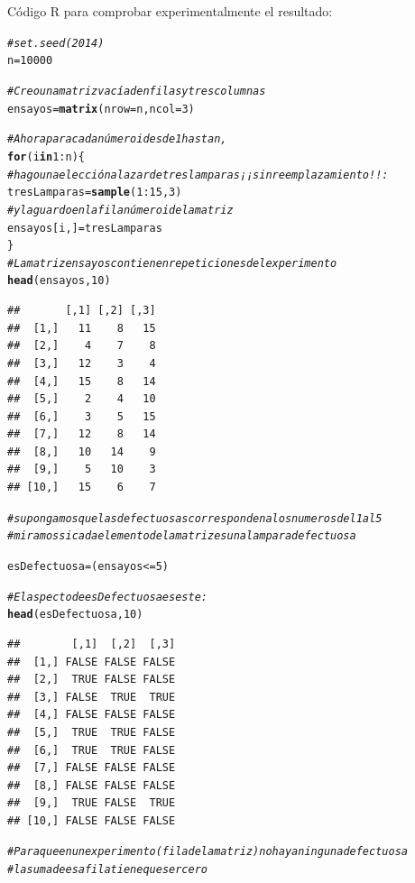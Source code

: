 \documentclass[10pt,a4paper]{article}\usepackage[]{graphicx}\usepackage[]{color}
\makeatletter
\newcommand{\hlnum}[1]{\textcolor[rgb]{0.686,0.059,0.569}{#1}}%
\newcommand{\hlcom}[1]{\textcolor[rgb]{0.678,0.584,0.686}{\textit{#1}}}%
\newcommand{\hlopt}[1]{\textcolor[rgb]{0,0,0}{#1}}%
\newcommand{\hlstd}[1]{\textcolor[rgb]{0.345,0.345,0.345}{#1}}%
\newcommand{\hlkwa}[1]{\textcolor[rgb]{0.161,0.373,0.58}{\textbf{#1}}}%
\newcommand{\hlkwb}[1]{\textcolor[rgb]{0.69,0.353,0.396}{#1}}%
\newcommand{\hlkwc}[1]{\textcolor[rgb]{0.333,0.667,0.333}{#1}}%
\newcommand{\hlkwd}[1]{\textcolor[rgb]{0.737,0.353,0.396}{\textbf{#1}}}%
\newenvironment{kframe}{%
 \def\at@end@of@kframe{}%
 \ifinner\ifhmode%
  \def\at@end@of@kframe{\end{minipage}}%
  \begin{minipage}{\columnwidth}%
 \fi\fi%
 \def\FrameCommand##1{\hskip\@totalleftmargin \hskip-\fboxsep
 \colorbox{shadecolor}{##1}\hskip-\fboxsep
     \hskip-\linewidth \hskip-\@totalleftmargin \hskip\columnwidth}%
 \MakeFramed {\advance\hsize-\width
   \@totalleftmargin\z@ \linewidth\hsize
   \@setminipage}}%
 {\par\unskip\endMakeFramed%
 \at@end@of@kframe}
\newenvironment{knitrout}{}{} %
\newcounter {cont01}
\makeatother
\begin{document}
Código R para comprobar experimentalmente el resultado:
\begin{knitrout}
\color{fgcolor}\begin{kframe}
\begin{alltt}
\hlcom{#set.seed(2014)}
\hlstd{n} \hlkwb{=} \hlnum{10000}

\hlcom{# Creo una matriz vacía de n filas y tres columnas}
\hlstd{ensayos} \hlkwb{=} \hlkwd{matrix}\hlstd{(}\hlkwc{nrow} \hlstd{= n,} \hlkwc{ncol} \hlstd{=} \hlnum{3}\hlstd{)}

\hlcom{# Ahora para cada número i desde 1 hasta n,}
\hlkwa{for}\hlstd{(i} \hlkwa{in} \hlnum{1}\hlopt{:}\hlstd{n)\{}
  \hlcom{# hago una elección al azar de tres lamparas ¡¡sin reemplazamiento!!:}
  \hlstd{tresLamparas} \hlkwb{=} \hlkwd{sample}\hlstd{(}\hlnum{1}\hlopt{:}\hlnum{15}\hlstd{,} \hlnum{3}\hlstd{)}
  \hlcom{# y la guardo en la fila número i de la matriz}
  \hlstd{ensayos[i, ]} \hlkwb{=} \hlstd{tresLamparas}
\hlstd{\}}
\hlcom{# La matriz ensayos contiene n repeticiones del experimento}
\hlkwd{head}\hlstd{(ensayos,} \hlnum{10}\hlstd{)}
\end{alltt}
\begin{verbatim}
##       [,1] [,2] [,3]
##  [1,]   11    8   15
##  [2,]    4    7    8
##  [3,]   12    3    4
##  [4,]   15    8   14
##  [5,]    2    4   10
##  [6,]    3    5   15
##  [7,]   12    8   14
##  [8,]   10   14    9
##  [9,]    5   10    3
## [10,]   15    6    7
\end{verbatim}
\begin{alltt}
\hlcom{# supongamos que las defectuosas corresponden a los numeros del 1 al 5}
\hlcom{# miramos si cada elemento de la matriz es una lampara defectuosa}

\hlstd{esDefectuosa} \hlkwb{=} \hlstd{(ensayos}\hlopt{<=} \hlnum{5}\hlstd{)}

\hlcom{# El aspecto de esDefectuosa es este:}
\hlkwd{head}\hlstd{(esDefectuosa,} \hlnum{10}\hlstd{)}
\end{alltt}
\begin{verbatim}
##        [,1]  [,2]  [,3]
##  [1,] FALSE FALSE FALSE
##  [2,]  TRUE FALSE FALSE
##  [3,] FALSE  TRUE  TRUE
##  [4,] FALSE FALSE FALSE
##  [5,]  TRUE  TRUE FALSE
##  [6,]  TRUE  TRUE FALSE
##  [7,] FALSE FALSE FALSE
##  [8,] FALSE FALSE FALSE
##  [9,]  TRUE FALSE  TRUE
## [10,] FALSE FALSE FALSE
\end{verbatim}
\begin{alltt}
\hlcom{# Para que en un experimento (fila de la matriz) no haya ninguna defectuosa}
\hlcom{# la suma de esa fila tiene que ser cero}


\end{alltt}
\end{kframe}
\end{knitrout}
\end{document}
